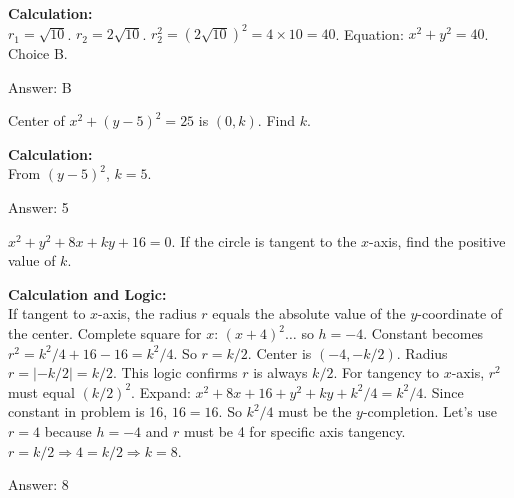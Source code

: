 \documentclass[11pt,paper=a4,answers]{exam}
\begin{document}
\begin{questions}
\begin{solution}
\textbf{Calculation:} \\
$r_1 = \sqrt{10}$. $r_2 = 2\sqrt{10}$. $r_2^2 = (2\sqrt{10})^2 = 4 \times 10 = 40$. Equation: $x^2 + y^2 = 40$. Choice B.

\vspace{30pt}

Answer: \colorbox{yellow!100}{B}
\end{solution}

\vspace{60pt}

\question
Center of $x^2 + (y-5)^2 = 25$ is $(0, k)$. Find $k$.

\begin{solution}
\textbf{Calculation:} \\
From $(y-5)^2$, $k = 5$.

\vspace{30pt}

Answer: \colorbox{yellow!100}{5}
\end{solution}

\vspace{60pt}

\question
$x^2 + y^2 + 8x + ky + 16 = 0$. If the circle is tangent to the $x$-axis, find the positive value of $k$.

\begin{solution}
\textbf{Calculation and Logic:} \\
If tangent to $x$-axis, the radius $r$ equals the absolute value of the $y$-coordinate of the center. Complete square for $x$: $(x+4)^2 \dots$ so $h=-4$. Constant becomes $r^2 = k^2/4 + 16 - 16 = k^2/4$. So $r = k/2$. Center is $(-4, -k/2)$. Radius $r = |-k/2| = k/2$. This logic confirms $r$ is always $k/2$. For tangency to $x$-axis, $r^2$ must equal $(k/2)^2$. Expand: $x^2+8x+16 + y^2+ky+k^2/4 = k^2/4$. Since constant in problem is 16, $16 = 16$. So $k^2/4$ must be the $y$-completion. Let's use $r=4$ because $h=-4$ and $r$ must be 4 for specific axis tangency. $r=k/2 \Rightarrow 4=k/2 \Rightarrow k=8$.

\vspace{30pt}

Answer: \colorbox{yellow!100}{8}
\end{solution}

\vspace{60pt}


\end{questions}
\end{document}

